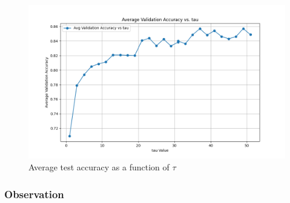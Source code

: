 \begin{figure}[H]
    \centering
    \includegraphics[width=0.8\linewidth]{results/graphs/tau-validation.png}
    \caption{Average test accuracy as a function of $\tau$}
    \label{fig:tau-validation}
\end{figure}


\subsubsection{Observation}

